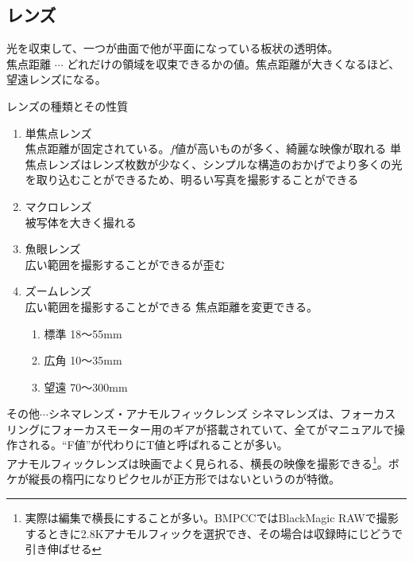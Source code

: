 \documentclass[dvipdfmx,jb5]{jreport}
\begin{document}
\subsection{レンズ}
光を収束して、一つが曲面で他が平面になっている板状の透明体。\\
焦点距離 $\cdots$ どれだけの領域を収束できるかの値。焦点距離が大きくなるほど、望遠レンズになる。
\begin{itembox}[l]{レンズの種類とその性質}
      \begin{enumerate}
            \item 単焦点レンズ\\
                  焦点距離が固定されている。$f値$が高いものが多く、綺麗な映像が取れる
                  単焦点レンズはレンズ枚数が少なく、シンプルな構造のおかげでより多くの光を取り込むことができるため、明るい写真を撮影することができる
            \item マクロレンズ\\被写体を大きく撮れる
            \item 魚眼レンズ\\広い範囲を撮影することができるが歪む
            \item ズームレンズ\\広い範囲を撮影することができる
                  焦点距離を変更できる。
                  \begin{enumerate}
                        \item 標準 18〜55mm
                        \item 広角 10〜35mm
                        \item 望遠 70〜300mm
                  \end{enumerate}
      \end{enumerate}
      その他$\cdots$シネマレンズ・アナモルフィックレンズ
      シネマレンズは、フォーカスリングにフォーカスモーター用のギアが搭載されていて、全てがマニュアルで操作される。``F値''が代わりにT値と呼ばれることが多い。\\
      アナモルフィックレンズは映画でよく見られる、横長の映像を撮影できる\footnote{実際は編集で横長にすることが多い。BMPCCではBlackMagic RAWで撮影するときに2.8Kアナモルフィックを選択でき、その場合は収録時にじどうで引き伸ばせる}。ボケが縦長の楕円になりピクセルが正方形ではないというのが特徴。
\end{itembox}
\end{document}

